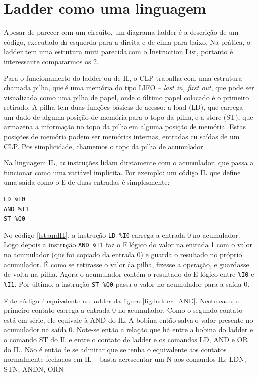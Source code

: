 \section{Ladder como uma linguagem}

Apesar de parecer com um circuito, um diagrama ladder é a descrição de um código, executado da esquerda para a direita e de cima para baixo. Na prática, o ladder tem uma estrutura muti parecida com o Instruction List, portanto é interessante compararmos os 2.

Para o funcionamento do ladder ou de IL, o CLP trabalha com uma estrutura chamada pilha, que é uma memória do tipo LIFO -- \emph{last in, first out}, que pode ser visualizada como uma pilha de papel, onde o último papel colocado é o primeiro retirado. A pilha tem duas funções básicas de acesso: a load (LD), que carrega um dado de alguma posição de memória para o topo da pilha, e a store (ST), que armazena a informação no topo da pilha em alguma posição de memória. Estas posições de memória podem ser memórias internas, entradas ou saídas de um CLP. Pos simplicidade, chamemos o topo da pilha de acumulador.

Na linguagem IL, as instruções lidam diretamente com o acumulador, que passa a funcionar como uma variável implícita. Por exemplo: um código IL que define uma saída como o E de duas entradas é simplesmente:
\begin{lstlisting}[caption=Código IL de um E lógico, label=lst:andIL]
LD %I0
AND %I1
ST %Q0
\end{lstlisting}

No código \ref{lst:andIL}, a instrução \lstinline|LD %I0| carrega a entrada 0 no acumulador. Logo depois a instrução \lstinline|AND %I1| faz o E lógico do valor na entrada 1 com o valor no acumulador (que foi copiado da entrada 0) e guarda o resultado no próprio acumulador. É como se retirasse o valor da pilha, fizesse a operação, e guardasse de volta na pilha. Agora o acumulador contém o resultado do E lógico entre \lstinline|%I0| e \lstinline|%I1|. Por último, a instrução \lstinline|ST %Q0| passa o valor no acumulador para a saída 0.

Este código é equivalente ao ladder da figura \ref{fig:ladder_AND}. Neste caso, o primeiro contato carrega a entrada 0 no acumulador. Como o segundo contato está em série, ele equivale à AND do IL. A bobina então salva o valor presente no acumulador na saída 0. Note-se então a relação que há entre a bobina do ladder e o comando ST do IL e entre o contato do ladder e os comandos LD, AND e OR do IL. Não é então de se admirar que se tenha o equivalente aos contatos normalmente fechados em IL -- basta acrescentar um N aos comandos IL: LDN, STN, ANDN, ORN.

